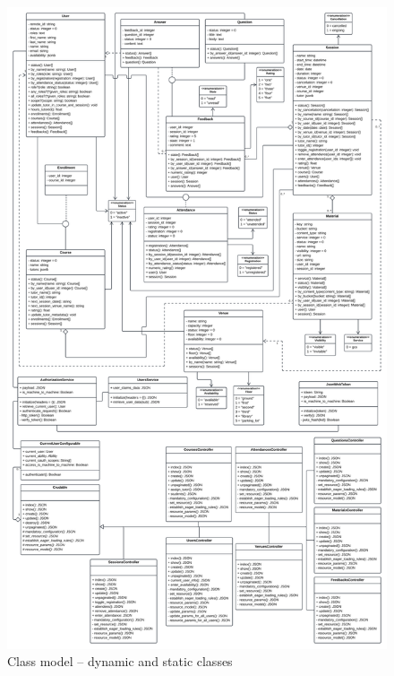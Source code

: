 \begin{justify}
\begin{figure}[H]
    \centerline{\includegraphics[width=140mm,scale=1]{figures/analysis_and_design/design/Dynamic Class Diagram V3.png}}
    \caption{Class model -- dynamic and static classes}
    \label{ClassModelStaticAndDynamic}
\end{figure}


\end{justify}
